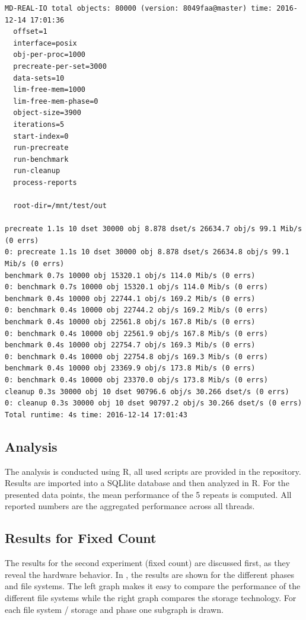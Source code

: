 \documentclass[a4paper,10pt]{article}
\begin{document}
\begin{lstlisting}[caption={Results for a single process using the SSD, ext4 and 1000 MB free memory\label{lst:SSD-ext4-1000-1}}]
MD-REAL-IO total objects: 80000 (version: 8049faa@master) time: 2016-12-14 17:01:36
  offset=1 
  interface=posix
  obj-per-proc=1000 
  precreate-per-set=3000 
  data-sets=10 
  lim-free-mem=1000 
  lim-free-mem-phase=0 
  object-size=3900 
  iterations=5 
  start-index=0 
  run-precreate
  run-benchmark
  run-cleanup
  process-reports

  root-dir=/mnt/test/out

precreate 1.1s 10 dset 30000 obj 8.878 dset/s 26634.7 obj/s 99.1 Mib/s (0 errs)
0: precreate 1.1s 10 dset 30000 obj 8.878 dset/s 26634.8 obj/s 99.1 Mib/s (0 errs)
benchmark 0.7s 10000 obj 15320.1 obj/s 114.0 Mib/s (0 errs)
0: benchmark 0.7s 10000 obj 15320.1 obj/s 114.0 Mib/s (0 errs)
benchmark 0.4s 10000 obj 22744.1 obj/s 169.2 Mib/s (0 errs)
0: benchmark 0.4s 10000 obj 22744.2 obj/s 169.2 Mib/s (0 errs)
benchmark 0.4s 10000 obj 22561.8 obj/s 167.8 Mib/s (0 errs)
0: benchmark 0.4s 10000 obj 22561.9 obj/s 167.8 Mib/s (0 errs)
benchmark 0.4s 10000 obj 22754.7 obj/s 169.3 Mib/s (0 errs)
0: benchmark 0.4s 10000 obj 22754.8 obj/s 169.3 Mib/s (0 errs)
benchmark 0.4s 10000 obj 23369.9 obj/s 173.8 Mib/s (0 errs)
0: benchmark 0.4s 10000 obj 23370.0 obj/s 173.8 Mib/s (0 errs)
cleanup 0.3s 30000 obj 10 dset 90796.6 obj/s 30.266 dset/s (0 errs)
0: cleanup 0.3s 30000 obj 10 dset 90797.2 obj/s 30.266 dset/s (0 errs)
Total runtime: 4s time: 2016-12-14 17:01:43
\end{lstlisting}


\subsection{Analysis}

The analysis is conducted using R, all used scripts are provided in the repository.
Results are imported into a SQLlite database and then analyzed in R.
For the presented data points, the mean performance of the 5 repeats is computed.
All reported numbers are the aggregated performance across all threads.

\subsection{Results for Fixed Count}

The results for the second experiment (fixed count) are discussed first, as they reveal the hardware behavior.
In , the results are shown for the different phases and file systems.
The left graph makes it easy to compare the performance of the different file systems while the right graph compares the storage technology.
For each file system / storage and phase one subgraph is drawn.
\end{document}
